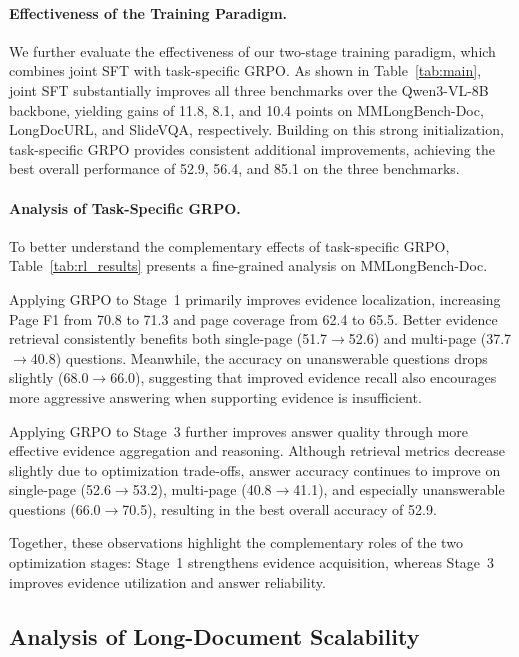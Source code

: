 \documentclass[letterpaper]{article} %
\begin{document}
\paragraph{Effectiveness of the Training Paradigm.}

We further evaluate the effectiveness of our two-stage training paradigm, which combines joint SFT with task-specific GRPO. As shown in Table~\ref{tab:main}, joint SFT substantially improves all three benchmarks over the Qwen3-VL-8B backbone, yielding gains of 11.8, 8.1, and 10.4 points on MMLongBench-Doc, LongDocURL, and SlideVQA, respectively. Building on this strong initialization, task-specific GRPO provides consistent additional improvements, achieving the best overall performance of 52.9, 56.4, and 85.1 on the three benchmarks.



\paragraph{Analysis of Task-Specific GRPO.}

To better understand the complementary effects of task-specific GRPO, Table~\ref{tab:rl_results} presents a fine-grained analysis on MMLongBench-Doc.

Applying GRPO to Stage~1 primarily improves evidence localization, increasing Page F1 from 70.8 to 71.3 and page coverage from 62.4 to 65.5. Better evidence retrieval consistently benefits both single-page (51.7$\rightarrow$52.6) and multi-page (37.7$\rightarrow$40.8) questions. Meanwhile, the accuracy on unanswerable questions drops slightly (68.0$\rightarrow$66.0), suggesting that improved evidence recall also encourages more aggressive answering when supporting evidence is insufficient.

Applying GRPO to Stage~3 further improves answer quality through more effective evidence aggregation and reasoning. Although retrieval metrics decrease slightly due to optimization trade-offs, answer accuracy continues to improve on single-page (52.6$\rightarrow$53.2), multi-page (40.8$\rightarrow$41.1), and especially unanswerable questions (66.0$\rightarrow$70.5), resulting in the best overall accuracy of 52.9.

Together, these observations highlight the complementary roles of the two optimization stages: Stage~1 strengthens evidence acquisition, whereas Stage~3 improves evidence utilization and answer reliability.



\subsection{Analysis of Long-Document Scalability}
\end{document}
